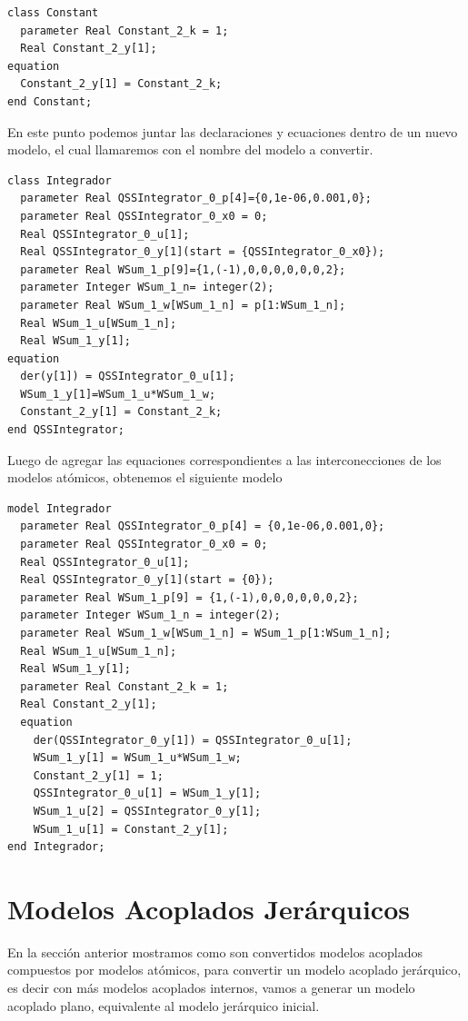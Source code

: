 \documentclass[a4paper,	11pt]{report}
\begin{document}
\begin{verbatim}	
class Constant
  parameter Real Constant_2_k = 1;
  Real Constant_2_y[1];
equation
  Constant_2_y[1] = Constant_2_k;
end Constant;	
\end{verbatim}

En este punto podemos juntar las declaraciones y ecuaciones dentro de un nuevo modelo, el cual llamaremos con el nombre del modelo a convertir.

\begin{verbatim}	
class Integrador
  parameter Real QSSIntegrator_0_p[4]={0,1e-06,0.001,0};
  parameter Real QSSIntegrator_0_x0 = 0;
  Real QSSIntegrator_0_u[1];
  Real QSSIntegrator_0_y[1](start = {QSSIntegrator_0_x0});
  parameter Real WSum_1_p[9]={1,(-1),0,0,0,0,0,0,2};
  parameter Integer WSum_1_n= integer(2);
  parameter Real WSum_1_w[WSum_1_n] = p[1:WSum_1_n];
  Real WSum_1_u[WSum_1_n];
  Real WSum_1_y[1];
equation
  der(y[1]) = QSSIntegrator_0_u[1];
  WSum_1_y[1]=WSum_1_u*WSum_1_w;
  Constant_2_y[1] = Constant_2_k;
end QSSIntegrator;
\end{verbatim}

Luego de agregar las equaciones correspondientes a las interconecciones de los modelos atómicos, obtenemos el siguiente modelo
	
\begin{verbatim}
model Integrador
  parameter Real QSSIntegrator_0_p[4] = {0,1e-06,0.001,0};
  parameter Real QSSIntegrator_0_x0 = 0;
  Real QSSIntegrator_0_u[1];
  Real QSSIntegrator_0_y[1](start = {0});
  parameter Real WSum_1_p[9] = {1,(-1),0,0,0,0,0,0,2};
  parameter Integer WSum_1_n = integer(2);
  parameter Real WSum_1_w[WSum_1_n] = WSum_1_p[1:WSum_1_n];
  Real WSum_1_u[WSum_1_n];
  Real WSum_1_y[1];
  parameter Real Constant_2_k = 1;
  Real Constant_2_y[1];
  equation
    der(QSSIntegrator_0_y[1]) = QSSIntegrator_0_u[1];
    WSum_1_y[1] = WSum_1_u*WSum_1_w;
    Constant_2_y[1] = 1;
    QSSIntegrator_0_u[1] = WSum_1_y[1];
    WSum_1_u[2] = QSSIntegrator_0_y[1];
    WSum_1_u[1] = Constant_2_y[1];
end Integrador;
\end{verbatim}

\section{Modelos Acoplados Jerárquicos}
En la sección anterior mostramos como son convertidos modelos acoplados compuestos por modelos atómicos, para convertir un modelo acoplado jerárquico, es decir con más modelos acoplados internos, vamos a generar un modelo acoplado plano, equivalente al modelo jerárquico inicial.
\end{document}
